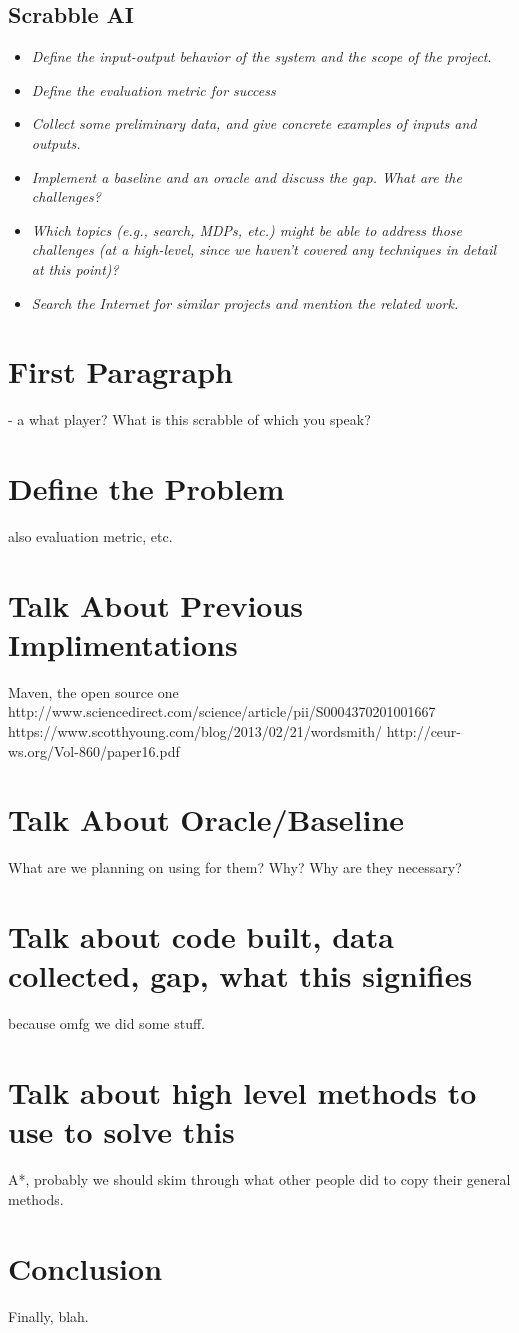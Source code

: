 \documentclass[12pt]{article}
\begin{document}
\subsection{Scrabble AI}
\begin{itemize}
  \item  \emph{Define the input-output behavior of the system and the scope of the project}.
  \item  \emph{Define the evaluation metric for success}
  \item  \emph{Collect some preliminary data, and give concrete examples of inputs and outputs.}
  \item  \emph{Implement a baseline and an oracle and discuss the gap. What are the challenges?}
  \item \emph{Which topics (e.g., search, MDPs, etc.) might be able to address those challenges (at a high-level, since we haven't covered any techniques in detail at this point)?}
  \item  \emph{Search the Internet for similar projects and mention the related work.}
\end{itemize}


\section{First Paragraph}
- a what player? What is this scrabble of which you speak? 

\section{Define the Problem}
  also evaluation metric, etc. 
\section{Talk About Previous Implimentations}
Maven, the open source one
http://www.sciencedirect.com/science/article/pii/S0004370201001667
https://www.scotthyoung.com/blog/2013/02/21/wordsmith/
http://ceur-ws.org/Vol-860/paper16.pdf
\section{Talk About Oracle/Baseline}
What are we planning on using for them? Why? Why are they necessary? 
\section{Talk about code built, data collected, gap, what this signifies}
because omfg we did some stuff. 
\section{Talk about high level methods to use to solve this}
A*, probably we should skim through what other people did to copy their general methods. 
\section*{Conclusion}

Finally, blah.
\end{document}
